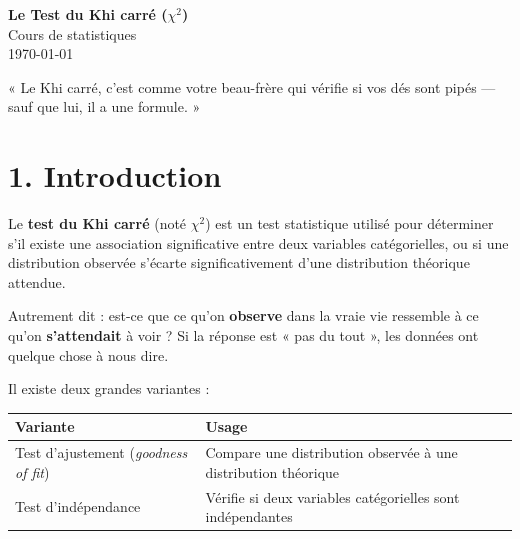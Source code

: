 \documentclass[12pt, a4paper]{article}
\begin{document}
\begin{center}
  {\LARGE \textbf{\textcolor{bleuCours}{Le Test du Khi carré} ($\chi^2$)}}\\[0.8em]
  {\large Cours de statistiques}\\[0.4em]
  {\normalsize \today}
\end{center}

\vspace{0.5em}

\begin{humourbox}
« Le Khi carré, c'est comme votre beau-frère qui vérifie si vos dés sont pipés ---
sauf que lui, il a une formule. »
\end{humourbox}

\vspace{1em}

\section{1. Introduction}

Le \textbf{test du Khi carré} (noté $\chi^2$) est un test statistique utilisé pour
déterminer s'il existe une association significative entre deux variables catégorielles,
ou si une distribution observée s'écarte significativement d'une distribution théorique
attendue.

Autrement dit : est-ce que ce qu'on \textbf{observe} dans la vraie vie ressemble à ce
qu'on \textbf{s'attendait} à voir ? Si la réponse est « pas du tout », les données ont
quelque chose à nous dire.

Il existe deux grandes variantes :

\vspace{0.5em}
\begin{center}
\begin{tabular}{lp{8cm}}
  \toprule
  \textbf{Variante} & \textbf{Usage} \\
  \midrule
  Test d'ajustement (\textit{goodness of fit}) & Compare une distribution observée à
    une distribution théorique \\[4pt]
  Test d'indépendance & Vérifie si deux variables catégorielles sont indépendantes \\
  \bottomrule
\end{tabular}
\end{center}

\end{document}
